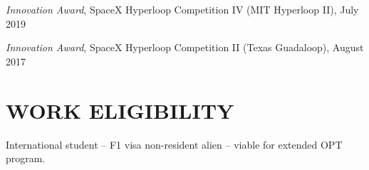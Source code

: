 \documentclass[11pt]{res}
\begin{document}
\begin{resume}
	\textit{Innovation Award}, SpaceX Hyperloop Competition IV (MIT Hyperloop II), July 2019
	\vspace{-12pt}
	
	\textit{Innovation Award}, SpaceX Hyperloop Competition II (Texas Guadaloop), August 2017

\vspace{-12pt}
\section{WORK ELIGIBILITY}
        \vspace{0pt}
	International student {}-- F1 visa non-resident alien {}-- viable for extended OPT program.  

\end{resume}
\end{document}
